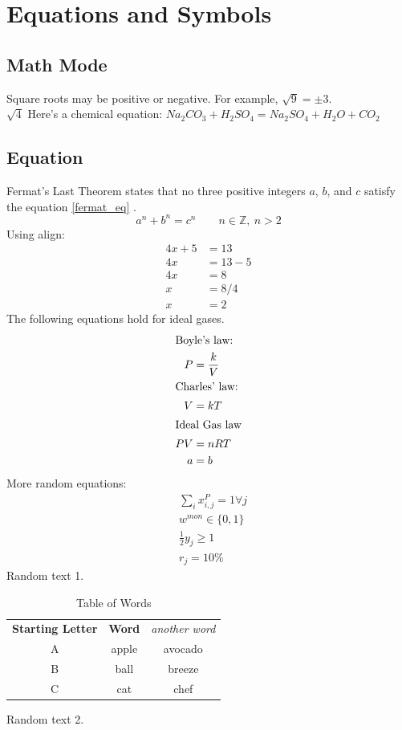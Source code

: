 \documentclass[]{article}
\begin{document}
\section{Equations and Symbols}
\subsection{Math Mode}
Square roots may be positive or negative. For example, $\sqrt{9} = \pm 3$.\\ $\sqrt{4}$
Here's a chemical equation: $Na_2CO_3 + H_2SO_4 = Na_2SO_4 + H_2O + CO_2 $
\subsection{Equation}

Fermat's Last Theorem  states that no three positive integers $a$, $b$, and $c$ satisfy the equation \ref{fermat_eq} \cite{wiki:fermat}. 
\begin{equation}
\label{fermat_eq}
a^n + b^n = c^n \qquad n \in \mathbb{Z}, \ n>2
\end{equation}
Using align:
\begin{align}
4x + 5 & = 13 \\
4x &= 13-5\\
4x &= 8\\
x &= 8/4\\
x&=2
\end{align}
The following equations hold for ideal gases.
\begin{subequations}
\begin{align}
\intertext{Boyle's law:}
P&=\frac{k}{V} \\ 
\intertext{Charles' law:}
V&=kT\\
\intertext{Ideal Gas law}
PV&=nRT
\\
a &= b
\end{align}
\end{subequations}
More random equations:
\begin{align}
&\sum_i x^P_{i,j} = 1 \forall j \\
&w^{mon} \in \{0,1\}  \\
&\frac{1}{2} y_{j} \geq 1 \\
&r_{j} = 10\% 
\end{align}
Random text 1.
\begin{table}[H]

\begin{center}
\begin{tabular}{c|c|c}
\textbf{Starting Letter}&\textbf{Word} &\textit{another word}\\
A&apple& avocado \\
B&ball & breeze\\
C&cat & chef
\end{tabular}
\end{center}
\caption{Table of Words}
\label{tab1}
\end{table}
Random text 2.
\end{document}
